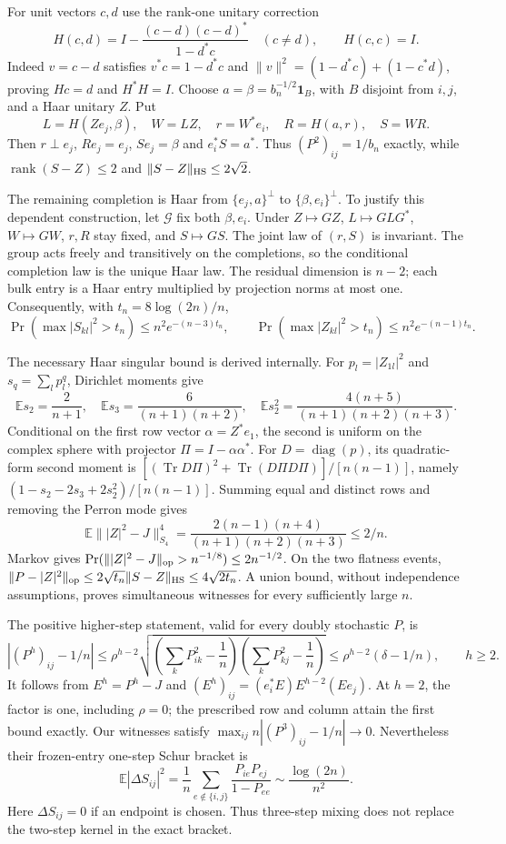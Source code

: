 For unit vectors $c,d$ use the rank-one unitary correction
\[
 H(c,d)=I-\frac{(c-d)(c-d)^*}{1-d^*c}\quad(c\ne d),\qquad H(c,c)=I.
\]
Indeed $v=c-d$ satisfies $v^*c=1-d^*c$ and
$\|v\|^2=(1-d^*c)+(1-c^*d)$, proving $Hc=d$ and $H^*H=I$.
Choose $a=\beta=b_n^{-1/2}\mathbf1_B$, with $B$ disjoint from $i,j$,
and a Haar unitary $Z$. Put
\[
 L=H(Ze_j,\beta),\quad W=LZ,\quad r=W^*e_i,\quad
 R=H(a,r),\quad S=WR.
\]
Then $r\perp e_j$, $Re_j=e_j$, $Se_j=\beta$ and $e_i^*S=a^*$.
Thus $(P^2)_{ij}=1/b_n$ exactly, while
$\operatorname{rank}(S-Z)\le2$ and $\|S-Z\|_{\rm HS}\le2\sqrt2$.

The remaining completion is Haar from $\{e_j,a\}^\perp$ to
$\{\beta,e_i\}^\perp$. To justify this dependent construction, let
$\mathcal G$ fix both $\beta,e_i$. Under $Z\mapsto GZ$,
$L\mapsto GLG^*$, $W\mapsto GW$, $r,R$ stay fixed, and $S\mapsto GS$.
The joint law of $(r,S)$ is invariant. The group acts freely and
transitively on the completions, so the conditional completion law is
the unique Haar law. The residual dimension is $n-2$; each bulk entry
is a Haar entry multiplied by projection norms at most one. Consequently,
with $t_n=8\log(2n)/n$,
\[
 \Pr(\max|S_{kl}|^2>t_n)\le n^2e^{-(n-3)t_n},\qquad
 \Pr(\max|Z_{kl}|^2>t_n)\le n^2e^{-(n-1)t_n}.
\]

The necessary Haar singular bound is derived internally. For
$p_l=|Z_{1l}|^2$ and $s_q=\sum_l p_l^q$, Dirichlet moments give
\[
 \mathbb Es_2=\frac2{n+1},\quad
 \mathbb Es_3=\frac6{(n+1)(n+2)},\quad
 \mathbb Es_2^2=\frac{4(n+5)}{(n+1)(n+2)(n+3)}.
\]
Conditional on the first row vector $\alpha=Z^*e_1$, the second is uniform
on the complex sphere with projector $\Pi=I-\alpha\alpha^*$.
For $D=\operatorname{diag}(p)$, its quadratic-form second moment is
$[(\operatorname{Tr}D\Pi)^2+\operatorname{Tr}(D\Pi D\Pi)]/[n(n-1)]$,
namely $(1-s_2-2s_3+2s_2^2)/[n(n-1)]$.
Summing equal and distinct rows and removing the Perron mode gives
\[
 \mathbb E\bigl\||Z|^2-J\bigr\|_{S_4}^4
 =\frac{2(n-1)(n+4)}{(n+1)(n+2)(n+3)}\le2/n.
\]
Markov gives $\Pr(\||Z|^2-J\|_{\rm op}>n^{-1/8})\le2n^{-1/2}$.
On the two flatness events,
$\|P-|Z|^2\|_{\rm op}\le2\sqrt{t_n}\|S-Z\|_{\rm HS}\le4\sqrt{2t_n}$.
A union bound, without independence assumptions, proves simultaneous
witnesses for every sufficiently large $n$.

The positive higher-step statement, valid for every doubly stochastic $P$, is
\[
 |(P^h)_{ij}-1/n|
 \le\rho^{h-2}
 \sqrt{\left(\sum_kP_{ik}^2-\frac1n\right)
       \left(\sum_kP_{kj}^2-\frac1n\right)}
 \le\rho^{h-2}(\delta-1/n),\qquad h\ge2.
\]
It follows from $E^h=P^h-J$ and
$(E^h)_{ij}=(e_i^*E)E^{h-2}(Ee_j)$. At $h=2$, the factor is one,
including $\rho=0$; the prescribed row and column attain the first bound
exactly. Our witnesses satisfy $\max_{ij}n|(P^3)_{ij}-1/n|\to0$.
Nevertheless their frozen-entry one-step Schur bracket is
\[
 \mathbb E|\Delta S_{ij}|^2
 =\frac1n\sum_{e\notin\{i,j\}}\frac{P_{ie}P_{ej}}{1-P_{ee}}
 \sim\frac{\log(2n)}{n^2}.
\]
Here $\Delta S_{ij}=0$ if an endpoint is chosen. Thus three-step mixing
does not replace the two-step kernel in the exact bracket.

